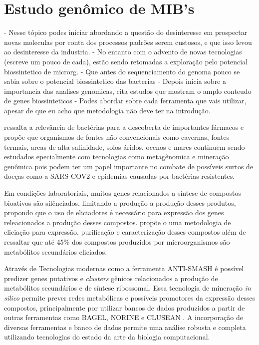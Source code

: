 \section{Estudo genômico de MIB's}
- Nesse tópico podes iniciar abordando a questão do desinteresse em prospectar novas moleculas por conta dos processos padrões serem custosos, e que isso levou ao desinteresse da industria. 
- No  entanto com o advento de novas tecnologias (escreve um pouco de cada), estão sendo retomadas a exploração pelo potencial biossintetico de microrg.
- Que antes do sequenciamento do genoma pouco se sabia sobre o potencial biossintetico das bacterias
- Depois inicia sobre a importancia das analises genomicas, cita estudos que mostram o amplo conteudo de genes biossinteticos
- Podes abordar sobre cada ferramenta que vais utilizar, apesar de que eu acho que metodologia não deve ter na introdução.


 ressalta a relevância de bactérias para a descoberta de importantes
fármacos e propõe que organismos de fontes não convencionais como cavernas, fontes termais,
areas de alta salinidade, solos áridos, ocenos e mares continuem sendo estudados epecialmente
com tecnologias como metagênomica e mineração genômica pois podem ter um papel importante no 
combate de possíveis surtos de doeças como a SARS-COV2 e epidemias causadas por bactérias resistentes.

Em condições laboratoriais, muitos genes relacionados a síntese de
compostos bioativos são silênciados, limitando a produção a produção desses produtos, propondo
que o uso de eliciadores é necessário para expressão dos genes releacionados a produção desses 
compostos\cite{rutledge2015}.  propõe o uma metodologia de eliciação para expressão, purificação
e caracterização desses compostos além de ressaltar que até 45\% dos compostos produzidos por
microorganismos são metabólitos secundários eliciados.

Através de Tecnologias modernas como a ferramenta ANTI-SMASH \cite{antismash} é possível predizer
genes putativos e \textit{clusters} gênicos relacionados a produção de metabólitos secundários
e de síntese ribossomal. Essa tecnologia de mineração \textit{in silico} permite prever redes
metabólicas e possíveis promotores da expressão desses compostos, principalmente por utilizar
bancos de dados produzidos a partir de outras ferramentas como BAGEL, NORINE e CLUSEAN \cite{bagel2,bagel3,norine,clusean}.
A incorporação de diversas ferramentas e banco de dados permite uma análise robusta 
e completa utilizando tecnologias do estado da arte da biologia computacional.

